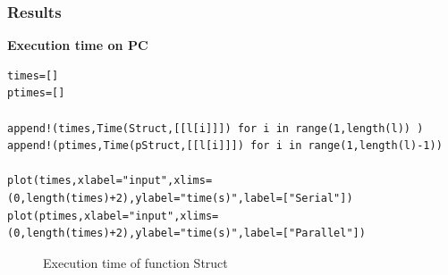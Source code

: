 \documentclass[a4paper,12pt]{article}
\begin{document}
\subsubsection{Results}
\textbf{Execution time on PC}
\begin{Verbatim}[fontsize=\footnotesize]
times=[]
ptimes=[]

append!(times,Time(Struct,[[l[i]]]) for i in range(1,length(l)) )
append!(ptimes,Time(pStruct,[[l[i]]]) for i in range(1,length(l)-1))

plot(times,xlabel="input",xlims=(0,length(times)+2),ylabel="time(s)",label=["Serial"])
plot(ptimes,xlabel="input",xlims=(0,length(times)+2),ylabel="time(s)",label=["Parallel"])

\end{Verbatim}
\begin{figure}[!h]
\centering
{}
\caption{Execution time of function Struct}
\end{figure}
\end{document}
